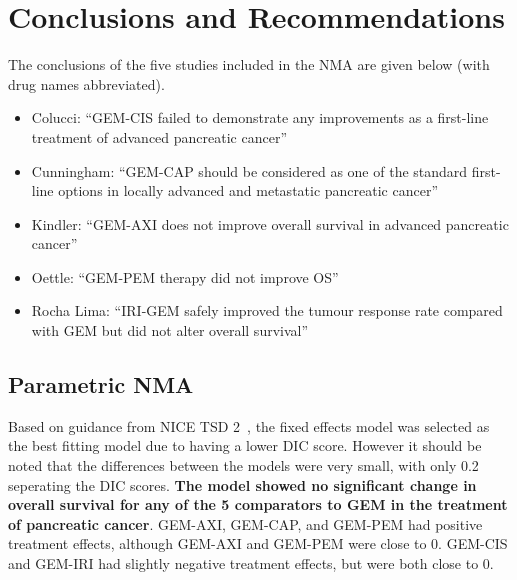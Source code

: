 \chapter{Conclusions and Recommendations}

The conclusions of the five studies included in the NMA are given below (with drug names abbreviated).

\begin{itemize}
    \item Colucci: ``GEM-CIS failed to demonstrate any improvements as a first-line treatment of advanced pancreatic cancer''
    \item Cunningham: ``GEM-CAP should be considered as one of the standard first-line options in locally advanced and metastatic pancreatic cancer''
    \item Kindler: ``GEM-AXI does not improve overall survival in advanced pancreatic cancer''
    \item Oettle: ``GEM-PEM therapy did not improve OS''
    \item Rocha Lima: ``IRI-GEM safely improved the tumour response rate compared with GEM but did not alter overall survival''
\end{itemize}

\section{Parametric NMA}
Based on guidance from NICE TSD 2~\cite{tsd2}, the fixed effects model was selected as the best fitting model due to having a lower DIC score. However it should be noted that the differences between the models were very small, with only 0.2 seperating the DIC scores. \textbf{The model showed no significant change in overall survival for any of the 5 comparators to GEM in the treatment of pancreatic cancer}. GEM-AXI, GEM-CAP, and GEM-PEM had positive treatment effects, although GEM-AXI and GEM-PEM were close to 0. GEM-CIS and GEM-IRI had slightly negative treatment effects, but were both close to 0. 

